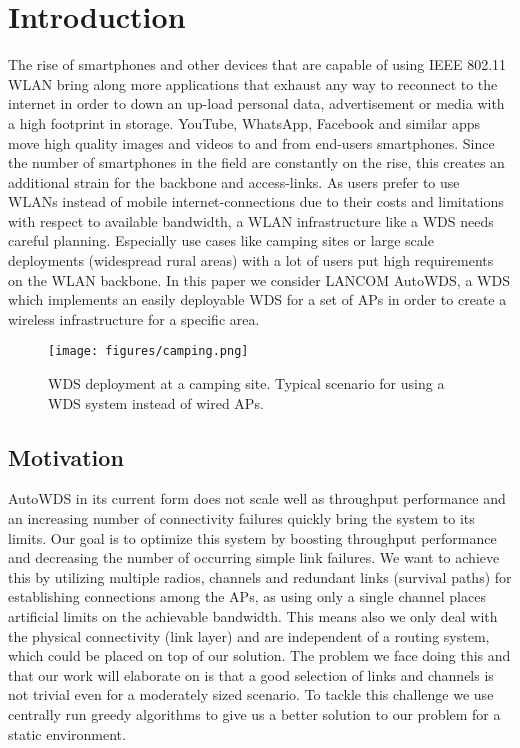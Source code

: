 \chapter{Introduction}
  The rise of smartphones and other devices that are capable of using IEEE 802.11 \ac{WLAN} bring along 
  more applications that exhaust any way to reconnect to the internet in order to 
  down an up-load personal data, advertisement or media with a high footprint in storage.
  YouTube, WhatsApp, Facebook and similar apps move high quality images and videos to and from end-users smartphones. 
  Since the number of smartphones in the field are constantly on the rise, this creates an additional strain for
  the backbone and access-links. As users prefer to use WLANs instead of mobile internet-connections due to their costs and limitations with respect to available bandwidth,
  a \ac{WLAN} infrastructure like a \ac{WDS} needs careful planning. Especially use cases like camping sites or large scale deployments (widespread rural areas) with a lot of users
  put high requirements on the \ac{WLAN} backbone. 
  In this paper we consider LANCOM AutoWDS, a \ac{WDS} which implements an easily deployable \ac{WDS} for a set of APs in order to create a wireless 
  infrastructure for a specific area.

  \begin{figure}[h]
    \centering
    \texttt{[image: figures/camping.png]}
    \caption{WDS deployment at a camping site. Typical scenario for using a \ac{WDS} system instead of wired APs.}
    \label{fig:camping}
  \end{figure}
  
\section{Motivation}
  AutoWDS in its current form does not scale well as throughput performance and an increasing number of connectivity failures quickly bring the system to its limits.
  Our goal is to optimize this system by boosting throughput performance and decreasing the number of occurring simple link failures.
  We want to achieve this by utilizing multiple radios, channels and redundant links (survival paths) for establishing connections among the APs, as using only a single
  channel places artificial limits on the achievable bandwidth.
  This means also we only deal with the physical connectivity (link layer) and are independent of a routing system, which could be placed on top of our solution.
  The problem we face doing this and that our work will elaborate on is that a good selection of links and channels is not trivial even for a moderately sized scenario.
  To tackle this challenge we use centrally run greedy algorithms to give us a better solution to our problem for a static environment.
  
